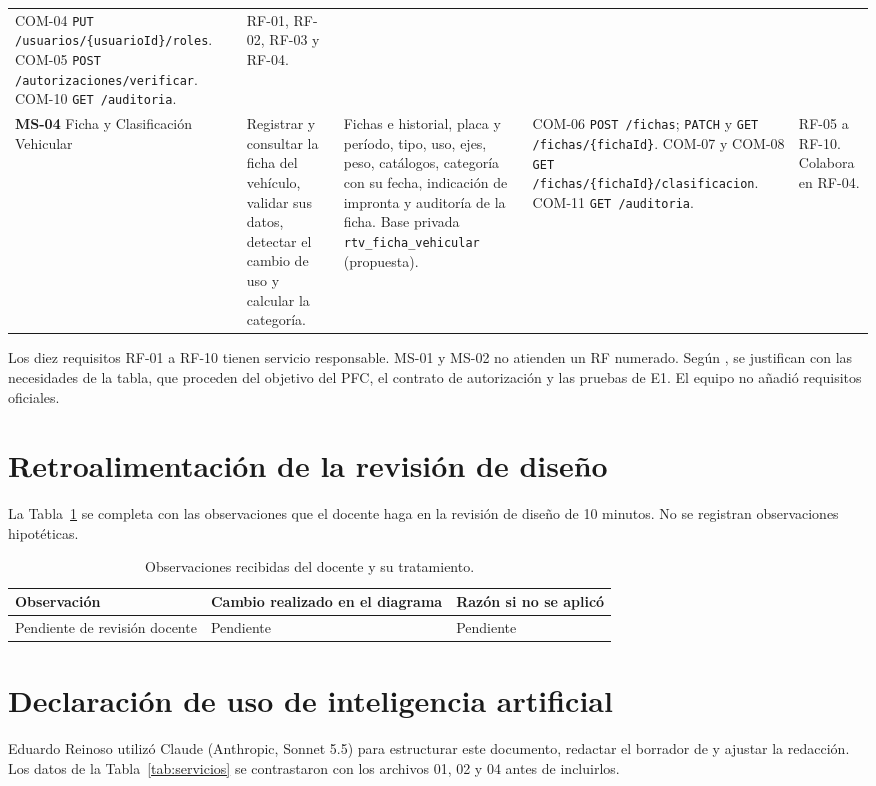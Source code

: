 \documentclass[11pt,a4paper]{article}
\begin{document}
\begin{longtable}{@{}p{1.9cm}p{3.3cm}p{4.1cm}p{3.1cm}p{2.1cm}@{}}
COM-04 \texttt{PUT /usuarios/\allowbreak\{usuarioId\}/roles}.\newline
COM-05 \texttt{POST /autorizaciones/\allowbreak verificar}.\newline
COM-10 \texttt{GET /auditoria}. &
RF-01, RF-02, RF-03 y RF-04.\\
\addlinespace
\textbf{MS-04} Ficha y Clasificación Vehicular &
Registrar y consultar la ficha del vehículo, validar sus datos, detectar el cambio de uso y calcular la categoría. &
Fichas e historial, placa y período, tipo, uso, ejes, peso, catálogos, categoría con su fecha, indicación de impronta y auditoría de la ficha. Base privada \texttt{rtv\_ficha\_vehicular} (propuesta). &
COM-06 \texttt{POST /fichas}; \texttt{PATCH} y \texttt{GET /fichas/\allowbreak\{fichaId\}}.\newline
COM-07 y COM-08 \texttt{GET /fichas/\allowbreak\{fichaId\}/\allowbreak clasificacion}.\newline
COM-11 \texttt{GET /auditoria}. &
RF-05 a RF-10. Colabora en RF-04.\\
\end{longtable}
\endgroup

Los diez requisitos RF-01 a RF-10 tienen servicio responsable. MS-01 y MS-02 no atienden un RF numerado. Según , se justifican con las necesidades de la tabla, que proceden del objetivo del PFC, el contrato de autorización y las pruebas de E1. El equipo no añadió requisitos oficiales.

\section{Retroalimentación de la revisión de diseño}

La Tabla~\ref{tab:retro} se completa con las observaciones que el docente haga en la revisión de diseño de 10 minutos. No se registran observaciones hipotéticas.

\begin{table}[h]
\centering
\footnotesize
\renewcommand{\arraystretch}{1.2}
\begin{tabular}{@{}p{5.1cm}p{5.1cm}p{4.6cm}@{}}
\toprule
\textbf{Observación} & \textbf{Cambio realizado en el diagrama} & \textbf{Razón si no se aplicó}\\
\midrule
Pendiente de revisión docente & Pendiente & Pendiente\\
\bottomrule
\end{tabular}
\caption{Observaciones recibidas del docente y su tratamiento.}\label{tab:retro}
\end{table}

\section{Declaración de uso de inteligencia artificial}

Eduardo Reinoso utilizó Claude (Anthropic, Sonnet 5.5) para estructurar este documento, redactar el borrador de  y ajustar la redacción. Los datos de la Tabla~\ref{tab:servicios} se contrastaron con los archivos 01, 02 y 04 antes de incluirlos.
\end{document}

